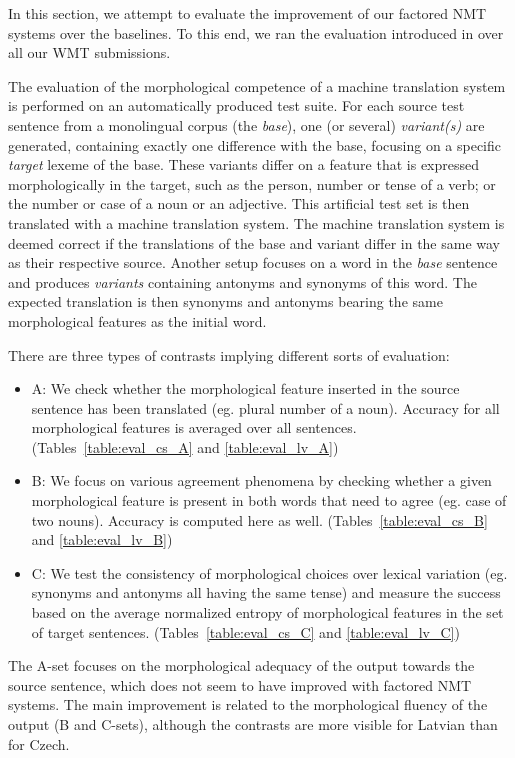 \documentclass[11pt,letterpaper,final]{article}
\begin{document}
In this section, we attempt to evaluate the improvement
of our factored NMT systems over the baselines. To this
end, we ran the evaluation introduced in \cite{burlot16morpheval}
over all our WMT submissions.

The evaluation of the morphological competence of a machine translation system is performed on an automatically produced test suite.
For each source test sentence from a monolingual corpus (the \emph{base}), one (or several) \emph{variant(s)} are generated, containing exactly one difference with the base, focusing on a specific \emph{target} lexeme of the base. These variants differ on a feature that is expressed morphologically in the target, such as the person, number or tense of a verb; or the number or case of a noun or an adjective.
This artificial test set is then translated with a machine translation system.
The machine translation system is deemed correct if the translations of the base and variant 
differ in the same way as their respective source.
Another setup focuses on a word
in the \emph{base} sentence and produces \emph{variants} containing antonyms
and synonyms of this word. The expected translation is then synonyms
and antonyms bearing the same morphological features as the initial word.

There are three types of contrasts implying different sorts of evaluation:

\begin{itemize}
  \item A: We check whether the morphological feature inserted in the source sentence
    has been translated (eg. plural number of a noun). Accuracy for all morphological
    features is averaged over all sentences. (Tables~\ref{table:eval_cs_A} and \ref{table:eval_lv_A})
  \item B: We focus on various agreement phenomena by checking whether a given morphological
    feature is present in both words that need to agree (eg. case of two nouns). Accuracy is computed here as well. (Tables~\ref{table:eval_cs_B} and \ref{table:eval_lv_B})
  \item C: We test the consistency of morphological choices over lexical variation (eg. synonyms and antonyms all having the same tense)
    and measure the success based on the average normalized entropy of morphological features in the set of target sentences. (Tables~\ref{table:eval_cs_C} and \ref{table:eval_lv_C})
\end{itemize}

The A-set focuses on the morphological adequacy of the output towards the source
sentence, which does not seem to have improved with factored NMT systems. The main
improvement is related to the morphological fluency of the output (B and C-sets),
although the contrasts are more visible for Latvian than for Czech.
\end{document}
